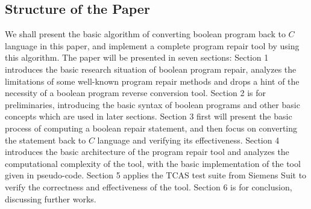 \subsection{Structure of the Paper}
\label{section:StructureOfThePaper}
We shall present the basic algorithm of converting boolean program back to $C$ language in this paper, and implement a complete program repair tool by using this algorithm.
The paper will be presented in seven sections:
Section 1 introduces the basic research situation of boolean program repair, analyzes the limitations of some well-known program repair methods and drops a hint of the necessity of a boolean program reverse conversion tool.
Section 2 is for preliminaries, introducing the basic syntax of boolean programs and other basic concepts which are used in later sections.
Section 3 first will present the basic process of computing a boolean repair statement, and then focus on converting the statement back to $C$ language and verifying its effectiveness.
Section 4 introduces the basic architecture of the program repair tool and analyzes the computational complexity of the tool, with the basic implementation of the tool given in pseudo-code.
Section 5 applies the TCAS test suite from Siemens Suit to verify the correctness and effectiveness of the tool.
Section 6 is for conclusion, discussing further works.